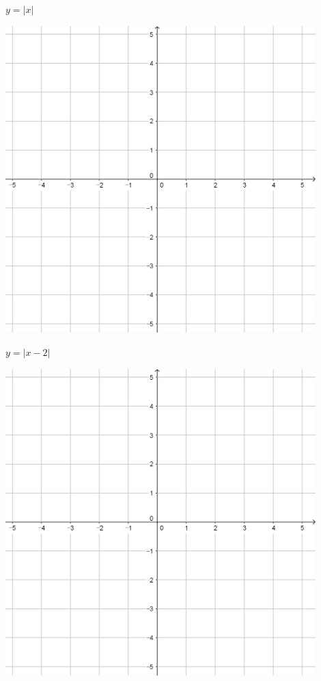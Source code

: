 \documentclass[a4paper]{oblivoir}
\begin{document}
\clearpage
\begin{minipage}{0.45\textwidth}\centering
\(y=|x|\)
\par\bigskip\includegraphics[width=0.9\textwidth]{55}
\end{minipage}
\begin{minipage}{0.45\textwidth}\centering
\(y=|x-2|\)
\par\bigskip\includegraphics[width=0.9\textwidth]{55}
\end{minipage}\bigskip\bigskip\par
\end{document}
